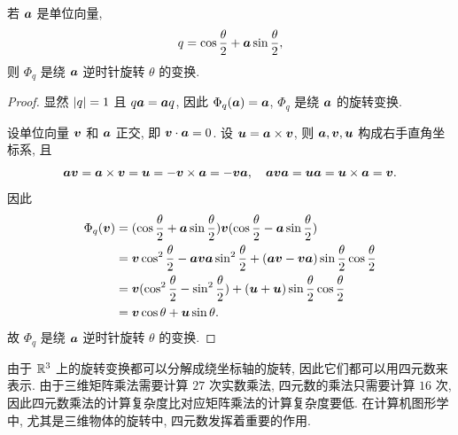 \begin{theorem}
  若 $\bfa$ 是单位向量,
  \[
    q=\cos\frac\theta2+\bfa\sin\frac\theta2,
  \]
  则 $\Phi_q$ 是绕 $\bfa$ 逆时针旋转 $\theta$ 的变换.
\end{theorem}

\begin{proof}
  显然 $\abs{q}=1$ 且 $q\bfa=\bfa q$, 因此 $\Phi_q(\bfa)=\bfa$, $\Phi_q$ 是绕 $\bfa$ 的旋转变换.

  设单位向量 $\bfv$ 和 $\bfa$ 正交, 即 $\bfv\cdot \bfa=0$.
  设 $\bfu=\bfa\times\bfv$, 则 $\bfa,\bfv,\bfu$ 构成右手直角坐标系, 且
  \[
    \bfa\bfv=\bfa\times\bfv=\bfu=-\bfv\times\bfa=-\bfv\bfa,\quad
    \bfa\bfv\bfa=\bfu\bfa=\bfu\times\bfa=\bfv.
  \]
  因此
  \begin{align*}
    \Phi_q(\bfv)&
    =(\cos\frac\theta2+\bfa\sin\frac\theta2)\bfv 
      (\cos\frac\theta2-\bfa\sin\frac\theta2)\\&
    =\bfv\cos^2\frac\theta2-\bfa\bfv\bfa\sin^2\frac\theta2
      +(\bfa\bfv-\bfv\bfa)\sin\frac\theta2\cos\frac\theta2\\&
    =\bfv(\cos^2\frac\theta2-\sin^2\frac\theta2)
      +(\bfu+\bfu)\sin\frac\theta2\cos\frac\theta2\\&
    =\bfv\cos\theta+\bfu\sin\theta.
  \end{align*}
  故 $\Phi_q$ 是绕 $\bfa$ 逆时针旋转 $\theta$ 的变换.
\end{proof}

由于 $\BR^3$ 上的旋转变换都可以分解成绕坐标轴的旋转, 因此它们都可以用四元数来表示.
由于三维矩阵乘法需要计算 $27$ 次实数乘法, 四元数的乘法只需要计算 $16$ 次, 因此四元数乘法的计算复杂度比对应矩阵乘法的计算复杂度要低.
在计算机图形学中, 尤其是三维物体的旋转中, 四元数发挥着重要的作用.


\newpage
{}

